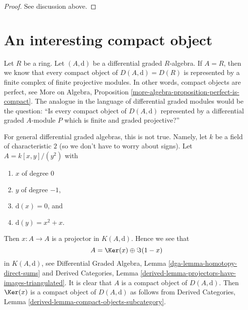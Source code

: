 \begin{proof}
See discussion above.
\end{proof}




\section{An interesting compact object}
\label{section-interesting-compact}


\noindent
Let $R$ be a ring. Let $(A, \text{d})$ be a differential graded $R$-algebra.
If $A = R$, then we know that every compact object of $D(A, \text{d}) = D(R)$
is represented by a finite complex of finite projective modules. In other
words, compact objects are perfect, see
More on Algebra, Proposition \ref{more-algebra-proposition-perfect-is-compact}.
The analogue in the language of differential graded modules would
be the question: ``Is every compact object of $D(A, \text{d})$ represented
by a differential graded $A$-module $P$ which is finite and
graded projective?''

\medskip\noindent
For general differential graded algebras, this is not true. Namely,
let $k$ be a field of characteristic $2$
(so we don't have to worry about signs).
Let $A = k[x, y]/(y^2)$
with
\begin{enumerate}
\item $x$ of degree $0$
\item $y$ of degree $-1$,
\item $\text{d}(x) = 0$, and
\item $\text{d}(y) = x^2 + x$.
\end{enumerate}
Then $x : A \to A$ is a projector in $K(A, \text{d})$.
Hence we see that
$$
A = \Ker(x) \oplus \Im(1 - x)
$$
in $K(A, \text{d})$, see
Differential Graded Algebra, Lemma \ref{dga-lemma-homotopy-direct-sums} and
Derived Categories, Lemma
\ref{derived-lemma-projectors-have-images-triangulated}.
It is clear that $A$ is a compact object of $D(A, \text{d})$.
Then $\Ker(x)$ is a compact object of $D(A, \text{d})$
as follows from
Derived Categories, Lemma \ref{derived-lemma-compact-objects-subcategory}.

